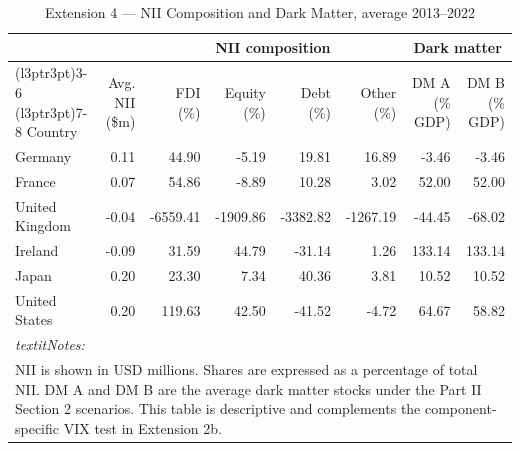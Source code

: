 \documentclass[11pt]{article}
\begin{document}
\small
\setcounter{table}{6}
\begin{table}[!h]
\centering
\caption{\label{tab:tab:p3_e4_nii_decomp}Extension 4 --- NII Composition and Dark Matter, average 2013--2022}
\centering
\fontsize{9.5}{11.5}\selectfont
\begin{tabular}[t]{lrrrrrrr}
\toprule
\multicolumn{2}{c}{\textbf{ }} & \multicolumn{4}{c}{\textbf{NII composition}} & \multicolumn{2}{c}{\textbf{Dark matter}} \\
\cmidrule(l{3pt}r{3pt}){3-6} \cmidrule(l{3pt}r{3pt}){7-8}
Country & Avg. NII (\$m) & FDI (\%) & Equity (\%) & Debt (\%) & Other (\%) & DM A (\% GDP) & DM B (\% GDP)\\
\midrule
Germany & 0.11 & 44.90 & -5.19 & 19.81 & 16.89 & -3.46 & -3.46\\
France & 0.07 & 54.86 & -8.89 & 10.28 & 3.02 & 52.00 & 52.00\\
United Kingdom & -0.04 & -6559.41 & -1909.86 & -3382.82 & -1267.19 & -44.45 & -68.02\\
Ireland & -0.09 & 31.59 & 44.79 & -31.14 & 1.26 & 133.14 & 133.14\\
Japan & 0.20 & 23.30 & 7.34 & 40.36 & 3.81 & 10.52 & 10.52\\
United States & 0.20 & 119.63 & 42.50 & -41.52 & -4.72 & 64.67 & 58.82\\
\bottomrule
\multicolumn{8}{l}{\rule{0pt}{1em}\textit{textit{Notes:} }}\\
\multicolumn{8}{l}{\rule{0pt}{1em}NII is shown in USD millions. Shares are expressed as a percentage of total NII. DM A and DM B are the average dark matter stocks under the Part II Section 2 scenarios. This table is descriptive and complements the component-specific VIX test in Extension 2b.}\\
\end{tabular}
\end{table}
\end{document}
